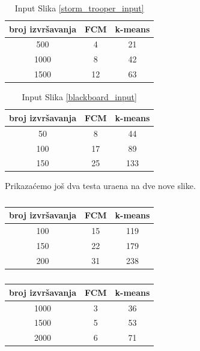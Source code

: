 \documentclass[12pt,a4paper]{article}
\theoremstyle{definition}
\theoremstyle{remark}
\theoremstyle{plain}
\begin{document}
\begin{multicols}{2}
\begin{table}[H]
\centering
  \begin{tabular}{c|c|c}
  broj izvr\v savanja & FCM & k-means\\
  \hline
  500 & 4 & 21\\
  1000 & 8 & 42\\
  1500 & 12 & 63 
\end{tabular}
  \caption{Input Slika \ref{storm_trooper_input}}
  \label{vreme_storm}
\end{table}

\columnbreak

\begin{table}[H]
\centering
\begin{tabular}{c|c|c}
  broj izvr\v savanja & FCM & k-means\\
  \hline
  50 & 8 & 44\\
  100 & 17 & 89\\
  150 & 25 & 133 
\end{tabular}
  \caption{Input Slika \ref{blackboard_input}}
  \label{vreme_blackboard}
\end{table}
\end{multicols}

Prikaza\' cemo jo\v s dva testa ura\dj ena na dve nove slike.

\begin{multicols}{2}
\begin{table}[H]
\centering
  \begin{tabular}{c|c|c}
  broj izvr\v savanja & FCM & k-means\\
  \hline
    100 & 15&  119 \\
    150&  22&  179 \\
    200&  31&  238
\end{tabular}
  \caption{}
\end{table}

\columnbreak

\begin{table}[H]
\centering
\begin{tabular}{c|c|c}
  broj izvr\v savanja & FCM & k-means\\
  \hline
  1000 & 3 & 36\\
  1500 & 5 & 53\\
  2000 & 6 & 71
\end{tabular}
  \caption{}
\end{table}
\end{multicols}
\end{document}
